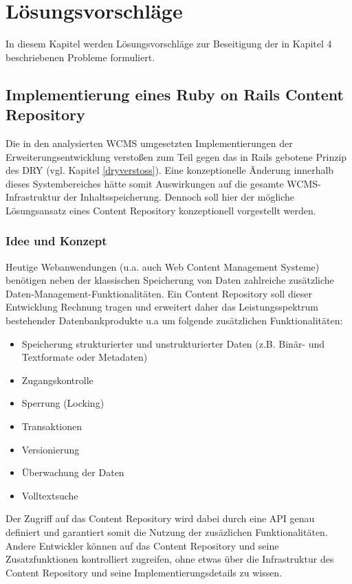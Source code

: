 \chapter{Lösungsvorschläge}
In diesem Kapitel werden Lösungsvorschläge zur Beseitigung der in Kapitel 4 beschriebenen Probleme formuliert.
\section{Implementierung eines Ruby on Rails Content Repository}

Die in den analysierten WCMS umgesetzten Implementierungen der Erweiterungsentwicklung verstoßen zum Teil gegen das in Rails gebotene Prinzip des DRY (vgl. Kapitel \ref{dryverstoss}). Eine konzeptionelle Änderung innerhalb dieses Systembereiches hätte somit Auswirkungen auf die gesamte WCMS-Infrastruktur der Inhaltsspeicherung. Dennoch soll hier der mögliche Lösungsansatz eines Content Repository konzeptionell vorgestellt werden.


\subsection{Idee und Konzept}

Heutige Webanwendungen (u.a. auch Web Content Management Systeme) benötigen neben der klassischen Speicherung von Daten zahlreiche zusätzliche Daten-Management-Funktionalitäten. Ein Content Repository soll dieser Entwicklung Rechnung tragen und erweitert daher das Leistungsspektrum bestehender Datenbankprodukte u.a um folgende zusätzlichen Funktionalitäten:

\begin{itemize}
\item
Speicherung strukturierter und unstrukturierter Daten (z.B. Binär- und Textformate oder Metadaten)
\item
Zugangskontrolle
\item
Sperrung (Locking)
\item
Transaktionen
\item
Versionierung
\item
Überwachung der Daten
\item
Volltextsuche
\end{itemize}

Der Zugriff auf das Content Repository wird dabei durch eine API genau definiert und garantiert somit die Nutzung der zusäzlichen Funktionalitäten. Andere Entwickler können auf das Content Repository und seine Zusatzfunktionen kontrolliert zugreifen, ohne etwas über die Infrastruktur des Content Repository und seine Implementierungsdetails zu wissen.


